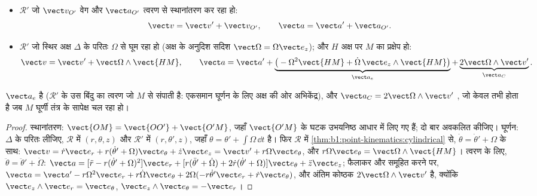\begin{theorem}[वेगों और त्वरणों का संयोजन]\label{thm:b1:non-inertial-frames:composition}
\begin{itemize}
  \item $\mathcal R'$ जो $\vect v_{O'}$ वेग और $\vect a_{O'}$ त्वरण से
        स्थानांतरण कर रहा हो:
        \[
        \vect v = \vect v' + \vect v_{O'}, \qquad \vect a = \vect a' + \vect a_{O'} .
        \]
  \item $\mathcal R'$ जो स्थिर अक्ष $\Delta$ के परितः $\Omega$ से घूम रहा हो
        (अक्ष के अनुदिश सदिश $\vect\Omega = \Omega\vect e_z$); और $H$ अक्ष
        पर $M$ का प्रक्षेप हो:
        \[
        \vect v = \vect v' + \vect\Omega\wedge\vect{HM}, \qquad
        \vect a = \vect a' + \underbrace{\big(-\Omega^2\vect{HM} + \dot\Omega\,\vect e_z\wedge\vect{HM}\big)}_{\vect a_e}
        + \underbrace{2\vect\Omega\wedge\vect v'}_{\vect a_C} .
        \]
\end{itemize}
$\vect a_e$ \emph{} है ($\mathcal R'$ के उस बिंदु का त्वरण जो
$M$ से संपाती है: एकसमान घूर्णन के लिए अक्ष की ओर अभिकेंद्र), और
$\vect a_C = 2\vect\Omega\wedge\vect v'$ \emph{}, जो केवल तभी
होता है जब $M$ घूर्णी तंत्र के सापेक्ष चल रहा हो।
\end{theorem}

\begin{proof}
स्थानांतरण: $\vect{OM} = \vect{OO'} + \vect{O'M}$, जहाँ
$\vect{O'M}$ के घटक उभयनिष्ठ आधार में लिए गए हैं; दो बार अवकलित कीजिए।
घूर्णन: $\Delta$ के परितः  लीजिए, $\mathcal R$ में
$(r, \theta, z)$ और $\mathcal R'$ में $(r, \theta', z)$, जहाँ
$\theta = \theta' + \int\Omega\,\dd t$ है।
फिर $\mathcal R$ में \cref{thm:b1:point-kinematics:cylindrical} से,
$\dot\theta = \dot\theta' + \Omega$ के साथ:
$\vect v = \dot r\vect e_r + r(\dot\theta' + \Omega)\vect e_\theta + \dot z\vect e_z
= \vect v' + r\Omega\vect e_\theta$, और $r\Omega\vect e_\theta = \vect\Omega\wedge\vect{HM}$।
त्वरण के लिए, $\ddot\theta = \ddot\theta' + \dot\Omega$:
$\vect a = [\ddot r - r(\dot\theta' + \Omega)^2]\vect e_r + [r(\ddot\theta' + \dot\Omega)
+ 2\dot r(\dot\theta' + \Omega)]\vect e_\theta + \ddot z\vect e_z$; फैलाकर और
समूहित करने पर, $\vect a = \vect a' - r\Omega^2\vect e_r + r\dot\Omega\vect e_\theta
+ 2\Omega(-r\dot\theta'\vect e_r + \dot r\vect e_\theta)$, और अंतिम कोष्ठक
$2\vect\Omega\wedge\vect v'$ है, क्योंकि $\vect e_z\wedge\vect e_r = \vect e_\theta$,
$\vect e_z\wedge\vect e_\theta = -\vect e_r$।
\end{proof}

